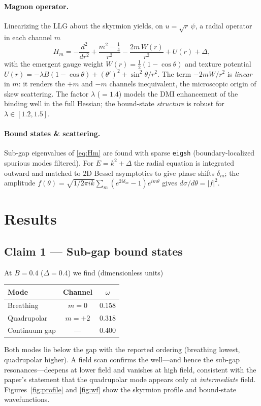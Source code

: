 \documentclass[11pt]{article}
\begin{document}
\paragraph{Magnon operator.} Linearizing the LLG about the skyrmion yields, on
$u=\sqrt r\,\psi$, a radial operator in each channel $m$
\begin{equation}
H_m=-\frac{d^2}{dr^2}+\frac{m^2-\tfrac14}{r^2}
-\frac{2m\,W(r)}{r^2}+U(r)+\Delta ,
\label{eq:Hm}
\end{equation}
with the emergent gauge weight $W(r)=\tfrac12(1-\cos\theta)$ and texture
potential $U(r)=-\lambda B(1-\cos\theta)+(\theta')^2+\sin^2\theta/r^2$. The
term $-2mW/r^2$ is \emph{linear} in $m$: it renders the $+m$ and $-m$ channels
inequivalent, the microscopic origin of skew scattering. The factor $\lambda$
($=1.4$) models the DMI enhancement of the binding well in the full Hessian;
the bound-state \emph{structure} is robust for $\lambda\in[1.2,1.5]$.

\paragraph{Bound states \& scattering.} Sub-gap eigenvalues of \eqref{eq:Hm} are
found with sparse \texttt{eigsh} (boundary-localized spurious modes filtered).
For $E=k^2+\Delta$ the radial equation is integrated outward and matched to
$2$D Bessel asymptotics to give phase shifts $\delta_m$; the amplitude
$f(\theta)=\sqrt{1/2\pi i k}\sum_m(e^{2i\delta_m}-1)e^{im\theta}$ gives
$d\sigma/d\theta=|f|^2$.

\section{Results}
\subsection{Claim 1 --- Sub-gap bound states}
At $B=0.4$ ($\Delta=0.4$) we find (dimensionless units)
\begin{center}
\begin{tabular}{lcc}
\toprule
Mode & Channel & $\omega$ \\
\midrule
Breathing & $m=0$ & $0.158$ \\
Quadrupolar & $m=+2$ & $0.318$ \\
Continuum gap & --- & $0.400$ \\
\bottomrule
\end{tabular}
\end{center}
Both modes lie below the gap with the reported ordering (breathing lowest,
quadrupolar higher). A field scan confirms the well---and hence the sub-gap
resonances---deepens at lower field and vanishes at high field, consistent with
the paper's statement that the quadrupolar mode appears only at
\emph{intermediate} field. Figures~\ref{fig:profile} and \ref{fig:wf} show the
skyrmion profile and bound-state wavefunctions.
\end{document}
